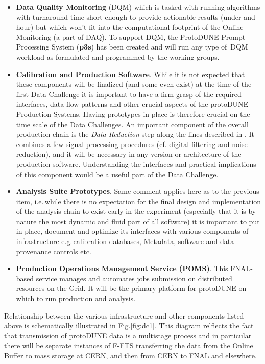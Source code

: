 \documentclass[pdftex,12pt,letter]{article}
\newcommand{\pd}{protoDUNE\xspace}
\begin{document}
\begin{itemize}
\item \textbf{Data Quality Monitoring} (DQM) which is tasked with running algorithms with turnaround time short enough to provide
actionable results (under and hour) but which won't fit into the computational footprint of the Online Monitoring (a part of DAQ).
To support DQM, the ProtoDUNE Prompt Processing System (\textbf{p3s}) \cite{docdb1811,p3s} has been created and will run any type of\
DQM workload as formulated and programmed by the working groups.

\item \textbf{Calibration and Production Software}. While it is not expected that these components will be finalized
(and some even exist) at the time of the first Data Challenge it is important to have a firm grasp of the required interfaces,
data flow patterns and other crucial aspects of the \pd Production Systems. Having prototypes in place is therefore crucial
on the time scale of the Data Challenges.
An important component of the overall production chain is the \textit{Data Reduction} step along the lines described
in \cite{docdb2089}. It combines a few signal-processing procedures (cf. digital filtering and noise reduction), and it will be
necessary in any version or architecture of the production software.
Understanding the interfaces and practical implications of this component would be a useful part of the Data Challenge.

\item \textbf{Analysis Suite Prototypes}. Same comment applies here as to the previous item, i.e.\,while there is no expectation
for the final design and implementation of the analysis chain to exist early in the experiment (especially that it is by nature the most
dynamic and fluid part of all software) it is important to put in place, document and optimize its interfaces with various components
of infrastructure e.g.\,calibration databases, Metadata, software and data provenance controls etc.

\item \textbf{Production Operations Management Service (POMS)}. This FNAL-based service \cite{poms} manages and automates jobs
submission on distributed resources on the Grid. It will be the primary platform for \pd on which to run production and analysis.


\end{itemize}
\noindent Relationship between the various infrastructure and other components listed above is schematically illustrated in
Fig.\ref{fig:dc1}. This diagram relflects the fact that transmission of \pd data is a multistage process and in particular there
will be separate instances of F-FTS transferring the data from the Online Buffer to mass storage at CERN, and then from
CERN to FNAL and elsewhere.
\end{document}
